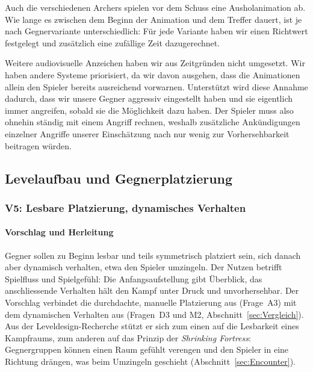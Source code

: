 \documentclass[../Main.tex]{subfiles}
\begin{document}
Auch die verschiedenen Archers spielen vor dem Schuss eine Ausholanimation ab. Wie lange es zwischen dem Beginn der Animation und dem Treffer dauert, ist je nach Gegnervariante unterschiedlich: Für jede Variante haben wir einen Richtwert festgelegt und zusätzlich eine zufällige Zeit dazugerechnet.

Weitere audiovisuelle Anzeichen haben wir aus Zeitgründen nicht umgesetzt. Wir haben andere Systeme priorisiert, da wir davon ausgehen, dass die Animationen allein den Spieler bereits ausreichend vorwarnen. Unterstützt wird diese Annahme dadurch, dass wir unsere Gegner aggressiv eingestellt haben und sie eigentlich immer angreifen, sobald sie die Möglichkeit dazu haben. Der Spieler muss also ohnehin ständig mit einem Angriff rechnen, weshalb zusätzliche Ankündigungen einzelner Angriffe unserer Einschätzung nach nur wenig zur Vorhersehbarkeit beitragen würden.

\subsection{Levelaufbau und Gegnerplatzierung} \label{sec:UmsetzungLevel}

\subsubsection{V5: Lesbare Platzierung, dynamisches Verhalten} \label{sec:V5}

\paragraph{Vorschlag und Herleitung}
Gegner sollen zu Beginn lesbar und teils symmetrisch platziert sein, sich danach aber dynamisch verhalten, etwa den Spieler umzingeln. Der Nutzen betrifft Spielfluss und Spielgefühl: Die Anfangsaufstellung gibt Überblick, das anschliessende Verhalten hält den Kampf unter Druck und unvorhersehbar. Der Vorschlag verbindet die durchdachte, manuelle Platzierung aus  (Frage~A3) mit dem dynamischen Verhalten aus  (Fragen~D3 und M2, Abschnitt~\ref{sec:Vergleich}). Aus der Leveldesign-Recherche stützt er sich zum einen auf die Lesbarkeit eines Kampfraums, zum anderen auf das Prinzip der \textit{Shrinking Fortress}: Gegnergruppen können einen Raum gefühlt verengen und den Spieler in eine Richtung drängen, was beim Umzingeln geschieht (Abschnitt~\ref{sec:Encounter}).
\end{document}

